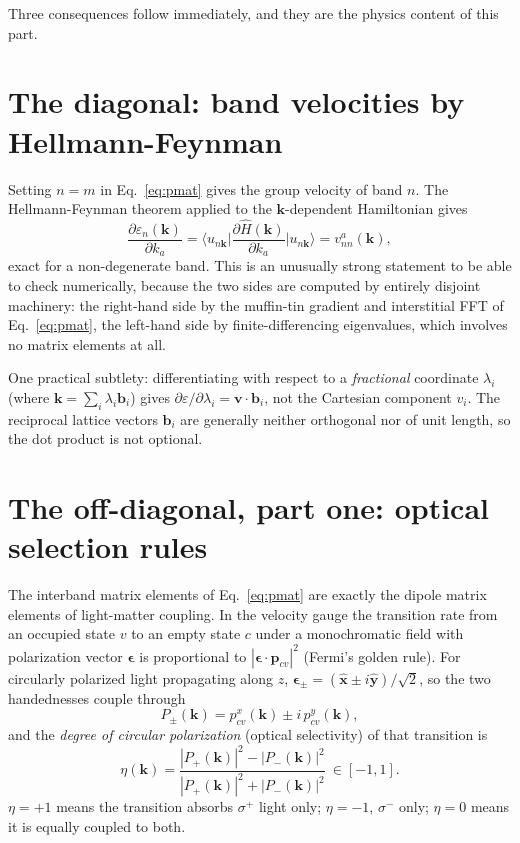 \documentclass[11pt]{article}
\begin{document}
Three consequences follow immediately, and they are the physics content of this part.

\section{The diagonal: band velocities by Hellmann-Feynman}

Setting $n=m$ in Eq.~\eqref{eq:pmat} gives the group velocity of band $n$. The
Hellmann-Feynman theorem applied to the $\mathbf k$-dependent Hamiltonian gives
\begin{equation}
  \frac{\partial\varepsilon_n(\mathbf k)}{\partial k_a}
  = \Big\langle u_{n\mathbf k}\Big|\frac{\partial \hat H(\mathbf k)}{\partial k_a}
    \Big|u_{n\mathbf k}\Big\rangle
  = v^a_{nn}(\mathbf k),
  \label{eq:hellmann}
\end{equation}
exact for a non-degenerate band. This is an unusually strong statement to be able to
check numerically, because the two sides are computed by entirely disjoint machinery:
the right-hand side by the muffin-tin gradient and interstitial FFT of
Eq.~\eqref{eq:pmat}, the left-hand side by finite-differencing eigenvalues, which
involves no matrix elements at all.

One practical subtlety: differentiating with respect to a \emph{fractional} coordinate
$\lambda_i$ (where $\mathbf k=\sum_i\lambda_i\mathbf b_i$) gives
$\partial\varepsilon/\partial\lambda_i = \mathbf v\cdot\mathbf b_i$, not the Cartesian
component $v_i$. The reciprocal lattice vectors $\mathbf b_i$ are generally neither
orthogonal nor of unit length, so the dot product is not optional.

\section{The off-diagonal, part one: optical selection rules}

The interband matrix elements of Eq.~\eqref{eq:pmat} are exactly the dipole matrix
elements of light-matter coupling. In the velocity gauge the transition rate from an
occupied state $v$ to an empty state $c$ under a monochromatic field with polarization
vector $\boldsymbol\epsilon$ is proportional to
$|\boldsymbol\epsilon\cdot\mathbf p_{cv}|^2$ (Fermi's golden rule). For circularly
polarized light propagating along $z$, $\boldsymbol\epsilon_\pm =
(\hat{\mathbf x}\pm i\hat{\mathbf y})/\sqrt2$, so the two handednesses couple through
\begin{equation}
  P_\pm(\mathbf k) = p^x_{cv}(\mathbf k) \pm i\,p^y_{cv}(\mathbf k),
  \label{eq:ppm}
\end{equation}
and the \emph{degree of circular polarization} (optical selectivity) of that transition is
\begin{equation}
  \eta(\mathbf k) = \frac{|P_+(\mathbf k)|^2-|P_-(\mathbf k)|^2}
                         {|P_+(\mathbf k)|^2+|P_-(\mathbf k)|^2}\ \in[-1,1].
  \label{eq:eta}
\end{equation}
$\eta=+1$ means the transition absorbs $\sigma^+$ light only; $\eta=-1$, $\sigma^-$ only;
$\eta=0$ means it is equally coupled to both.
\end{document}
